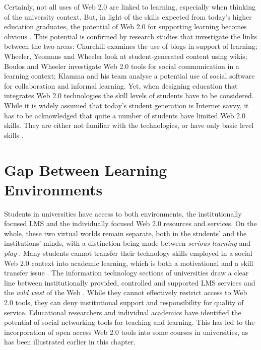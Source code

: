 Certainly, not all uses of Web 2.0 are linked to learning, especially when
thinking of the university context. But, in light of the \LLLs skills expected
from today's higher education graduates, the potential of Web 2.0 for supporting
learning becomes obvious \citep{Tian2011}. This potential is confirmed by
research studies that investigate the links between the two areas: Churchill
\citeyearpar{Churchill2009} examines the use of blogs in support of learning;
Wheeler, Yeomans and Wheeler \citeyearpar{Wheeler2008} look at student-generated
content using wikis; Boulos and Wheeler \citeyearpar{Boulos2007} investigate Web
2.0 tools for social communication in a learning context; Klamma and his team
\citeyearpar{Klamma2007} analyse a potential use of social software for
collaboration and informal learning. Yet, when designing education that
integrates Web 2.0 technologies the skill levels of students have to be
considered. While it is widely assumed that today's student generation is
Internet savvy, it has to be acknowledged that quite a number of students have
limited Web 2.0 skills. They are either not familiar with the technologies, or
have only basic level skills \citep{Kennedy2008}.

\section{Gap Between Learning Environments}
Students in universities have access to both environments, the institutionally
focused LMS and the individually focused Web 2.0 resources and services. On the
whole, these two virtual worlds remain separate, both in the students' and the
institutions' minds, with a distinction being made between \textit{serious
learning} and \textit{play} \citep{Freire2008}. Many students cannot transfer
their technology skills employed in a social Web 2.0 context into academic
learning, which is both a motivational and a skill transfer issue
\citep{Katz2005}. The information technology sections of universities draw a
clear line between institutionally provided, controlled and supported LMS
services and the \textit{wild west} of the Web \citep{Havenstein2007a}. While
they cannot effectively restrict access to Web 2.0 tools, they can deny
institutional support and responsibility for quality of service. Educational
researchers and individual academics have identified the potential of social
networking tools for teaching and learning. This has led to the incorporation of
open access Web 2.0 tools into some courses in universities, as has been
illustrated earlier in this chapter.

